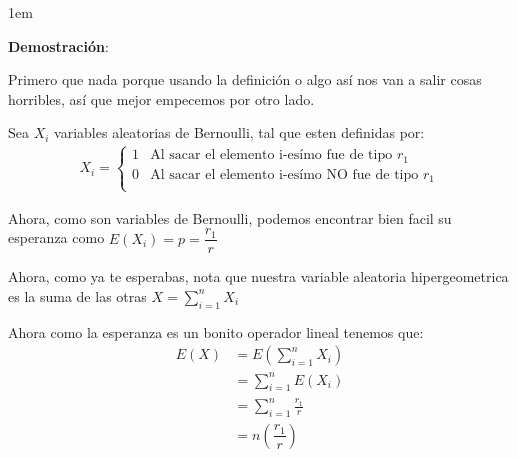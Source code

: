 \documentclass[12pt, fleqn]{report}                             %
\newenvironment{SmallIndentation}[1][0.75em]                    %
        {\begin{adjustwidth}{#1}{}\begin{footnotesize}}             %
        {\end{footnotesize}\end{adjustwidth}}                       %
\theoremstyle{break}                                            %
\newcommand{\Wrap}[1]{\left( #1 \right)}                        %
\newcommand{\pfrac}[2]{\Wrap{\dfrac{#1}{#2}}}                   %
\begin{document}
                \begin{SmallIndentation}[1em]
                    \textbf{Demostración}:
                    
                    Primero que nada porque usando la definición o algo así nos van a
                    salir cosas horribles, así que mejor empecemos por otro lado.

                    Sea $X_i$ variables aleatorias de Bernoulli, tal que esten
                    definidas por: 
                    \begin{align*}
                        X_i = 
                            \begin{cases}
                                1 & \text{Al sacar el elemento i-esímo fue de tipo $r_1$}        \\
                                0 & \text{Al sacar el elemento i-esímo NO fue de tipo $r_1$}     \\
                            \end{cases}
                    \end{align*}

                    Ahora, como son variables de Bernoulli, podemos encontrar bien facil
                    su esperanza como $E(X_i) = p = \dfrac{r_1}{r}$

                    Ahora, como ya te esperabas, nota que nuestra variable aleatoria hipergeometrica
                    es la suma de las otras $X = \sum_{i = 1}^n X_i$

                    Ahora como la esperanza es un bonito operador lineal tenemos que:
                    \begin{align*}
                        E(X)
                            &= E \Wrap{\sum_{i = 1}^n X_i}      \\
                            &= \sum_{i = 1}^n E(X_i)            \\
                            &= \sum_{i = 1}^n \frac{r_1}{r}     \\
                            &= n \pfrac{r_1}{r}   
                    \end{align*}
                    
                \end{SmallIndentation}

\end{document}
